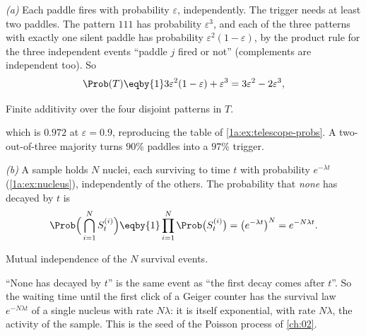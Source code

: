 \label{1a:ex:indep-physics}
\emph{(a)} Each paddle fires with probability $\varepsilon$, independently. The
trigger needs at least two paddles. The pattern $111$ has probability
$\varepsilon^3$, and each of the three patterns with exactly one silent paddle
has probability $\varepsilon^2(1-\varepsilon)$, by the product rule for the three
independent events ``paddle $j$ fired or not'' (complements are independent
too). So
\begin{align*}
\Prob(T)\eqby{1}3\varepsilon^2(1-\varepsilon)+\varepsilon^3=3\varepsilon^2-2\varepsilon^3,
\end{align*}
\begin{explain}
  \item Finite additivity over the four disjoint patterns in $T$.
\end{explain}
which is $0.972$ at $\varepsilon=0.9$, reproducing the table of
\cref{1a:ex:telescope-probs}. A two-out-of-three majority turns $90\%$ paddles into
a $97\%$ trigger.

\emph{(b)} A sample holds $N$ nuclei, each surviving to time $t$ with probability
$e^{-\lambda t}$ (\cref{1a:ex:nucleus}), independently of the others. The
probability that \emph{none} has decayed by $t$ is
\begin{align*}
\Prob\Bigl(\,\bigcap_{i=1}^NS^{(i)}_t\Bigr)\eqby{1}\prod_{i=1}^N\Prob\bigl(S^{(i)}_t\bigr)
=\bigl(e^{-\lambda t}\bigr)^N=e^{-N\lambda t}.
\end{align*}
\begin{explain}
  \item Mutual independence of the $N$ survival events.
\end{explain}
``None has decayed by $t$'' is the same event as ``the first decay comes after
$t$''. So the waiting time until the first click of a Geiger counter has the
survival law $e^{-N\lambda t}$ of a single nucleus with rate $N\lambda$: it is
itself exponential, with rate $N\lambda$, the activity of the sample. This is
the seed of the Poisson process of \cref{ch:02}.

